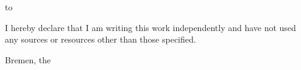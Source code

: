 \thispagestyle{empty}
\vspace*{38\baselineskip}
\hbox to \textwidth{\hrulefill}
\par
\noindent 
I hereby declare that I am writing this work independently and 
have not used any sources or resources other than those specified.
\par
\vspace*{4\baselineskip}
\noindent Bremen, the \timeend

\clearpage






